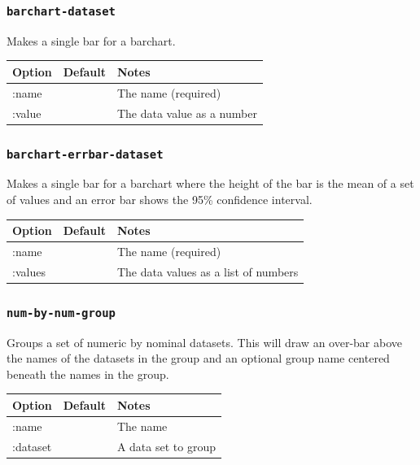 \documentclass{article}
\begin{document}
\subsubsection{\tt barchart-dataset}

Makes a single bar for a barchart.

\begin{center}
\begin{tabular}{lll}
Option & Default & Notes \\
\hline
:name & & The name (required)\\
:value & & The data value as a number\\
\end{tabular}
\end{center}

\subsubsection{\tt barchart-errbar-dataset}

Makes a single bar for a barchart where the height of the bar is the
mean of a set of values and an error bar shows the 95\% confidence
interval.

\begin{center}
\begin{tabular}{lll}
Option & Default & Notes \\
\hline
:name & & The name (required)\\
:values & & The data values as a list of numbers\\
\end{tabular}
\end{center}

\subsubsection{\tt num-by-num-group}

Groups a set of numeric by nominal datasets.  This will draw an
over-bar above the names of the datasets in the group and an optional
group name centered beneath the names in the group.

\begin{center}
\begin{tabular}{lll}
Option & Default & Notes \\
\hline
:name & & The name\\
:dataset & & A data set to group\\
\end{tabular}
\end{center}
\end{document}
